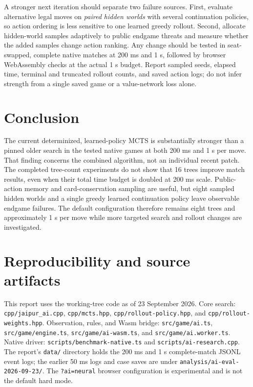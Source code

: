\documentclass{article}
\newcommand{\code}[1]{\texttt{#1}}
\begin{document}
A stronger next iteration should separate two failure sources. First, evaluate alternative legal moves on \emph{paired hidden worlds} with several continuation policies, so action ordering is less sensitive to one learned greedy rollout. Second, allocate hidden-world samples adaptively to public endgame threats and measure whether the added samples change action ranking. Any change should be tested in seat-swapped, complete native matches at 200 ms and 1 s, followed by browser WebAssembly checks at the actual 1 s budget. Report sampled seeds, elapsed time, terminal and truncated rollout counts, and saved action logs; do not infer strength from a single saved game or a value-network loss alone.

\section{Conclusion}

The current determinized, learned-policy MCTS is substantially stronger than a pinned older search in the tested native games at both 200 ms and 1 s per move. That finding concerns the combined algorithm, not an individual recent patch. The completed tree-count experiments do not show that 16 trees improve match results, even when their total time budget is doubled at 200 ms scale. Public-action memory and card-conservation sampling are useful, but eight sampled hidden worlds and a single greedy learned continuation policy leave observable endgame failures. The default configuration therefore remains eight trees and approximately 1 s per move while more targeted search and rollout changes are investigated.

\section*{Reproducibility and source artifacts}

This report uses the working-tree code as of 23 September 2026. Core search: \code{cpp/jaipur\_ai.cpp}, \code{cpp/mcts.hpp}, \code{cpp/rollout-policy.hpp}, and \code{cpp/rollout-weights.hpp}. Observation, rules, and Wasm bridge: \code{src/game/ai.ts}, \code{src/game/engine.ts}, \code{src/game/ai-wasm.ts}, and \code{src/game/ai.worker.ts}. Native driver: \code{scripts/benchmark-native.ts} and \code{scripts/ai-research.cpp}. The report's \code{data/} directory holds the 200 ms and 1 s complete-match JSONL event logs; the earlier 50 ms logs and case saves are under \code{analysis/ai-eval-2026-09-23/}. The \code{?ai=neural} browser configuration is experimental and is not the default hard mode.
\end{document}

